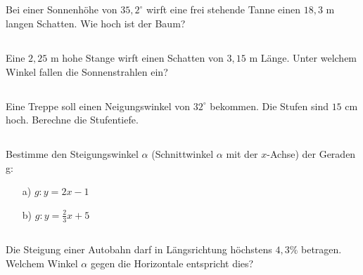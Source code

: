 \documentclass{article}
\newcommand{\exercise}[1]{\subsection{#1}}
\begin{document}
\setcounter{section}{1}\setcounter{subsection}{0}
\exercise{}
Bei einer Sonnenhöhe von $35,2^\circ$ wirft eine frei stehende Tanne einen $18,3$ m langen Schatten. Wie hoch ist der Baum?

\exercise{}
Eine $2,25$ m hohe Stange wirft einen Schatten von $3,15$ m L\"ange. Unter welchem Winkel fallen die Sonnenstrahlen ein?

\exercise{}
Eine Treppe soll einen Neigungswinkel von $32^\circ$ bekommen. Die Stufen sind $15$ cm hoch. Berechne die Stufentiefe.

\exercise{}
Bestimme den Steigungswinkel $\alpha$ (Schnittwinkel $\alpha$ mit der $x$-Achse) der Geraden g:
\begin{itemize}
\item[a)] $g: y = 2x-1$
\item[b)] $g: y = \frac{2}{3} x + 5$
\end{itemize}

\exercise{}
Die Steigung einer Autobahn darf in L\"angsrichtung h\"ochstens $4,3\%$ betragen. Welchem Winkel $\alpha$ gegen die Horizontale entspricht dies?
\end{document}
